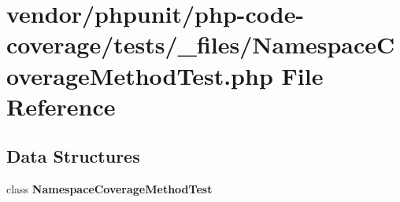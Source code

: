 \section{vendor/phpunit/php-\/code-\/coverage/tests/\+\_\+files/\+Namespace\+Coverage\+Method\+Test.php File Reference}
\label{php-code-coverage_2tests_2__files_2_namespace_coverage_method_test_8php}
\subsection*{Data Structures}
\begin{DoxyCompactItemize}
\item 
class {\bf Namespace\+Coverage\+Method\+Test}
\end{DoxyCompactItemize}
